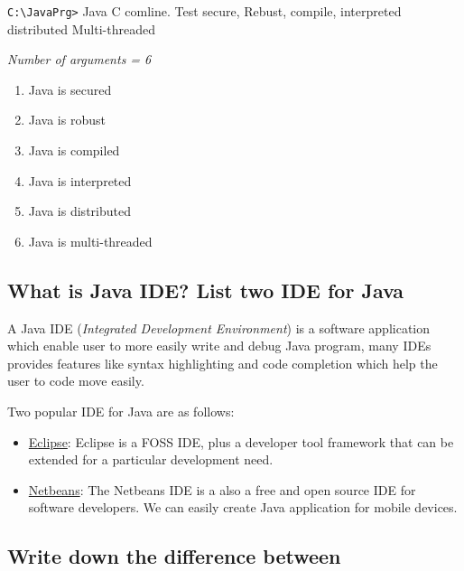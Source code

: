 \documentclass[11pt, a4paper]{book}
\begin{document}
      \Large \texttt{C:\textbackslash JavaPrg>} \small Java C comline. Test secure, Rebust, compile, interpreted distributed Multi-threaded\normalsize
      
      \noindent \emph{Number of arguments = 6}
  
      \begin{enumerate}

        \item Java is secured
        \item Java is robust
        \item Java is compiled
        \item Java is interpreted
        \item Java is distributed
        \item Java is multi-threaded
  
       \end{enumerate}
    
      
    \subsection{What is Java IDE? List two IDE for Java}
      A Java IDE (\textit{Integrated Development Environment}) is a software application which enable user to more easily write and debug Java program, many IDEs provides features like syntax highlighting and code completion which help the user to code move easily.
    
      Two popular IDE for Java are as follows:
  
      \begin{itemize}
  
        \item \underline{Eclipse}: Eclipse is a FOSS IDE, plus a developer tool framework that can be extended for a particular development need.
        \item \underline{Netbeans}: The Netbeans IDE is a also a free and open source IDE for software developers. We can easily create Java application for mobile devices.
  
      \end{itemize}
    
    \subsection{Write down the difference between}
\end{document}
